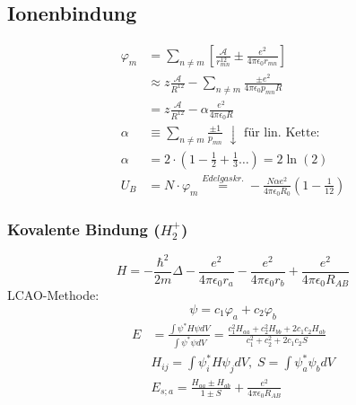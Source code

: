 \subsection*{Ionenbindung}
\begin{equation*}
    \begin{aligned}
        \varphi_m &= \sum_{n \neq m} \left[\frac{\mathcal{A}}{r_{mn}^{12}} \pm \frac{e^2}{4 \pi \epsilon_0 r_{mn}}\right] \\
            &\approx z \frac{\mathcal{A}}{R^{12}} - \sum_{n \neq m} \frac{\pm e^2}{4 \pi \epsilon_0 p_{mn}R} \\
            &= z  \frac{\mathcal{A}}{R^{12}} - \alpha \frac{e^2}{4 \pi \epsilon_0 R} \\
        \alpha & \equiv \sum_{n \neq m} \frac{\pm 1}{p_{mn}} \; \downarrow \text{ für lin. Kette:}\\
        \alpha &= 2 \cdot \left(1 - \frac{1}{2} + \frac{1}{3} \dots \right) = 2 \ln(2)  \\
        U_B &= N \cdot \varphi_m \overset{Edelgaskr.}{=} - \frac{N \alpha e^2}{4 \pi \epsilon_0 R_0} \left(1- \frac{1}{12}\right)
    \end{aligned}
\end{equation*}

\subsubsection*{Kovalente Bindung ($H_2^+$)}
\begin{equation*}
    H = -\frac{\hbar^2}{2m} \Delta - \frac{e^2}{4 \pi \epsilon_0 r_a} - \frac{e^2}{4 \pi \epsilon_0 r_b} +\frac{e^2}{4 \pi \epsilon_0 R_{AB}}
\end{equation*}
LCAO-Methode:
\begin{equation*}
    \psi = c_1\varphi_a + c_2 \varphi_b
\end{equation*}
\begin{equation*}
    \begin{aligned}
        E &= \frac{\int \psi^* H \psi dV}{\int \psi^* \psi dV} = \frac{c_1^2H_{aa}+c_2^2H_{bb}+2c_1c_2H_{ab}}{c_1^2+c_2^2+2c_1c_2S} \\
        &H_{ij} = \int \psi_i^* H \psi_j dV , \; S= \int \psi_a^* \psi_b dV \\
        &E_{s;a} = \frac{H_{aa} \pm H_{ab}}{1 \pm S} + \frac{e^2}{4 \pi \epsilon_0 R_{AB}}
    \end{aligned}
\end{equation*}

